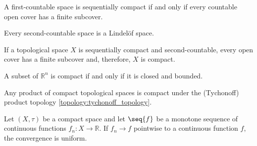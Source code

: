 
    \begin{property}
        A first-countable space is sequentially compact if and only if every countable open cover has a finite subcover.
    \end{property}

    \begin{property}
        Every second-countable space is a Lindel\"of space.
    \end{property}


    \begin{theorem}\label{topology:heine_borel}
        If a topological space $X$ is sequentially compact and second-countable, every open cover has a finite subcover and, therefore, $X$ is compact.
    \end{theorem}
    \begin{result}
        A subset of $\mathbb{R}^n$ is compact if and only if it is closed and bounded.
    \end{result}

    \begin{theorem}
        Any product of compact topological spaces is compact under the (Tychonoff) product topology \ref{topology:tychonoff_topology}.
    \end{theorem}



    \begin{theorem}[Dini]
        Let $(X,\tau)$ be a compact space and let $\seq{f}$ be a monotone sequence of continuous functions $f_n:X\rightarrow\mathbb{R}$. If $f_n\longrightarrow f$ pointwise to a continuous function $f$, the convergence is uniform.
    \end{theorem}

